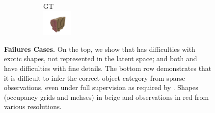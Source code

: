 \begin{figure}[t]
{\begin{subfigure}[t]{0.5\textwidth}
\begin{subfigure}[t]{0.15\textwidth}
	        \vspace{0px}\centering
	        GT\\
	        \includegraphics[width=1.5cm,trim={\cropleft cm \croplower cm \cropright cm \cropupper cm},clip]{gdat_modelnet_modelnet10_low_10656_bin}
	    \end{subfigure}
	\end{subfigure}
    }    
    \vspace*{-\figskipcaption px}
    \caption{{\bf Failures Cases.} On the top, we show that \AML has difficulties with exotic shapes, not represented in the latent space; and both \AML and \Dai have difficulties with fine details. The bottom row demonstrates that it is difficult to infer the correct object category from sparse observations, even under full supervision as required by \Dai. Shapes (occupancy grids and mehses) in {\color{rbeige}beige} and observations in {\color{rred}red} from various resolutions.}
    \label{fig:results-failures}
    \vspace*{-\figskipbelow px}
\end{figure}